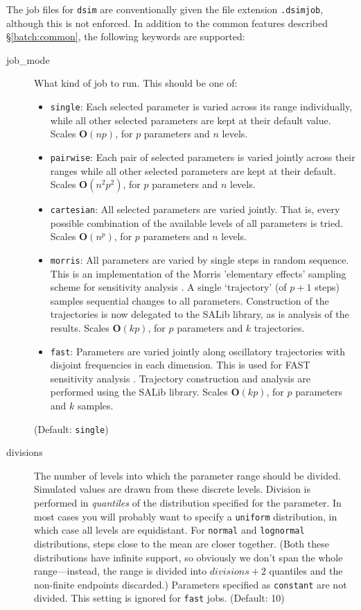 \documentclass[a4paper,11pt]{article}
\begin{document}
The job files for \texttt{dsim} are conventionally given the file extension \texttt{.dsimjob}, although this is not enforced. In addition to the common features described \S\ref{batch:common}, the following keywords are supported:
\begin{adjustwidth}{0.8cm}{0.8cm}
\begin{description}
\item[job\_mode] What kind of job to run. This should be one of:
	\begin{itemize}
	\item \texttt{single}: Each selected parameter is varied across its range individually, while all other selected parameters are kept at their default value. Scales $\mathbf{O}(np)$, for $p$ parameters and $n$ levels.
	\item \texttt{pairwise}: Each pair of selected parameters is varied jointly across their ranges while all other selected parameters are kept at their default. Scales $\mathbf{O}(n^2p^2)$, for $p$ parameters and $n$ levels.
	\item \texttt{cartesian}: All selected parameters are varied jointly. That is, every possible combination of the available levels of all parameters is tried. Scales $\mathbf{O}(n^{p})$, for $p$ parameters and $n$ levels.
	\item \texttt{morris}: All parameters are varied by single steps in random sequence. This is an implementation of the Morris 'elementary effects' sampling scheme for sensitivity analysis \citep{Morris:1991vs,Campolongo:2007cv}. A single `trajectory' (of $p+1$ steps) samples sequential changes to all parameters. Construction of the trajectories is now delegated to the SALib library, as is analysis of the results. Scales $\mathbf{O}(kp)$, for $p$ parameters and $k$ trajectories.
	\item \texttt{fast}: Parameters are varied jointly along oscillatory trajectories with disjoint frequencies in each dimension. This is used for FAST sensitivity analysis \citep{Saltelli:1999ur}. Trajectory construction and analysis are performed using the SALib library. Scales $\mathbf{O}(kp)$, for $p$ parameters and $k$ samples.
	\end{itemize}
(Default: \texttt{single})
\item[divisions] The number of levels into which the parameter range should be divided. Simulated values are drawn from these discrete levels. Division is performed in \textit{quantiles} of the distribution specified for the parameter. In most cases you will probably want to specify a \texttt{uniform} distribution, in which case all levels are equidistant. For \texttt{normal} and \texttt{lognormal} distributions, steps close to the mean are closer together. (Both these distributions have infinite support, so obviously we don't span the whole range---instead, the range is divided into $divisions+2$ quantiles and the non-finite endpoints discarded.) Parameters specified as \texttt{constant} are not divided. This setting is ignored for \texttt{fast} jobs. (Default: 10)

\end{description}
\end{adjustwidth}
\end{document}
